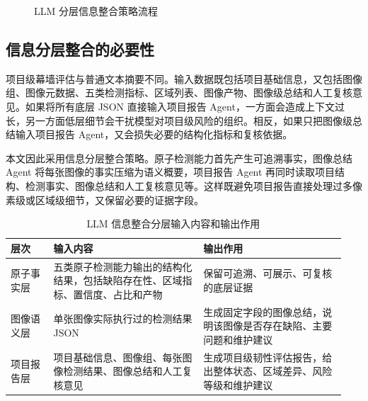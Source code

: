\begin{figure}[!htbp]
{
  }
  \caption{LLM 分层信息整合策略流程}\label{fig:design-llm-hierarchical-integration-flow}
\end{figure}

\subsection{信息分层整合的必要性}
\label{subsec:design-llm-hierarchy-necessity}

项目级幕墙评估与普通文本摘要不同。输入数据既包括项目基础信息，又包括图像组、图像元数据、五类检测指标、区域列表、图像产物、图像级总结和人工复核意见。如果将所有底层 JSON 直接输入项目报告 Agent，一方面会造成上下文过长，另一方面低层细节会干扰模型对项目级风险的组织。相反，如果只把图像级总结输入项目报告 Agent，又会损失必要的结构化指标和复核依据。

本文因此采用信息分层整合策略。原子检测能力首先产生可追溯事实，图像总结 Agent 将每张图像的事实压缩为语义概要，项目报告 Agent 再同时读取项目结构、检测事实、图像总结和人工复核意见等。这样既避免项目报告直接处理过多像素级或区域级细节，又保留必要的证据字段。

\begin{table}[!htb]
  \caption{LLM 信息整合分层输入内容和输出作用}\label{tab:design-llm-hierarchical-integration}
  \centering
  \begin{tabular}{@{}p{0.12\linewidth}p{0.42\linewidth}p{0.4\linewidth}@{}} \toprule
    \textbf{层次} & \textbf{输入内容} & \textbf{输出作用} \\ \midrule
    原子事实层 & 五类原子检测能力输出的结构化结果，包括缺陷存在性、区域指标、置信度、占比和产物 & 保留可追溯、可展示、可复核的底层证据 \\
    图像语义层 & 单张图像实际执行过的检测结果 JSON & 生成固定字段的图像总结，说明该图像是否存在缺陷、主要问题和维护建议 \\
    项目报告层 & 项目基础信息、图像组、每张图像检测结果、图像总结和人工复核意见 & 生成项目级韧性评估报告，给出整体状态、区域差异、风险等级和维护建议 \\ \bottomrule
  \end{tabular}
\end{table}

